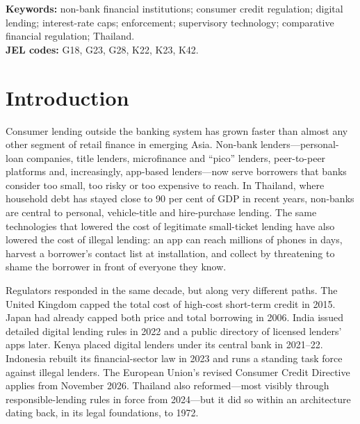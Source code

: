 \documentclass[11pt]{article}
\theoremstyle{plain}
\theoremstyle{definition}
\theoremstyle{remark}
\begin{document}
\vspace{4pt}
\noindent\textbf{Keywords:} non-bank financial institutions; consumer credit regulation; digital lending; interest-rate caps; enforcement; supervisory technology; comparative financial regulation; Thailand.\\[2pt]
\noindent\textbf{JEL codes:} G18, G23, G28, K22, K23, K42.

\vspace{6pt}
\noindent{}

\newpage
{\small\tableofcontents}
\newpage

\section{Introduction}\label{sec:intro}

Consumer lending outside the banking system has grown faster than almost any other segment of retail finance in emerging Asia. Non-bank lenders---personal-loan companies, title lenders, microfinance and ``pico'' lenders, peer-to-peer platforms and, increasingly, app-based lenders---now serve borrowers that banks consider too small, too risky or too expensive to reach. In Thailand, where household debt has stayed close to 90 per cent of GDP in recent years, non-banks are central to personal, vehicle-title and hire-purchase lending. The same technologies that lowered the cost of legitimate small-ticket lending have also lowered the cost of illegal lending: an app can reach millions of phones in days, harvest a borrower's contact list at installation, and collect by threatening to shame the borrower in front of everyone they know.

Regulators responded in the same decade, but along very different paths. The United Kingdom capped the total cost of high-cost short-term credit in 2015. Japan had already capped both price and total borrowing in 2006. India issued detailed digital lending rules in 2022 and a public directory of licensed lenders' apps later. Kenya placed digital lenders under its central bank in 2021--22. Indonesia rebuilt its financial-sector law in 2023 and runs a standing task force against illegal lenders. The European Union's revised Consumer Credit Directive applies from November 2026. Thailand also reformed---most visibly through responsible-lending rules in force from 2024---but it did so within an architecture dating back, in its legal foundations, to 1972.
\end{document}
